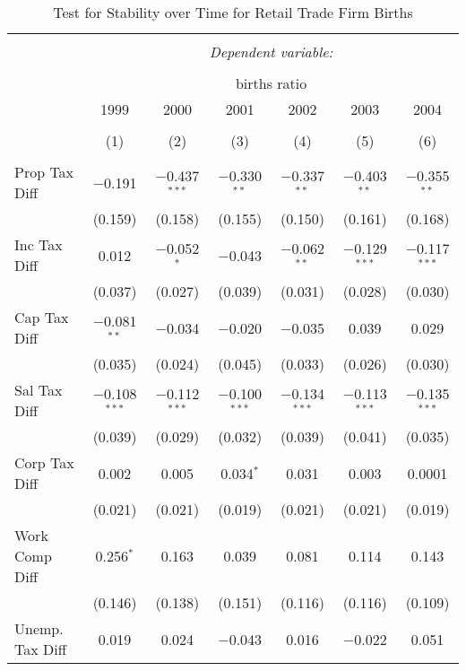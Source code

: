 
\begin{table}[!htbp] \centering 
  \caption{Test for Stability over Time for  Retail Trade Firm Births} 
  \label{44-45year} 
\small 
\begin{tabular}{@{\extracolsep{5pt}}lcccccc} 
\\[-1.8ex]\hline 
\hline \\[-1.8ex] 
 & \multicolumn{6}{c}{\textit{Dependent variable:}} \\ 
\cline{2-7} 
\\[-1.8ex] & \multicolumn{6}{c}{births ratio} \\ 
 & 1999 & 2000 & 2001 & 2002 & 2003 & 2004 \\ 
\\[-1.8ex] & (1) & (2) & (3) & (4) & (5) & (6)\\ 
\hline \\[-1.8ex] 
 Prop Tax Diff & $-$0.191 & $-$0.437$^{***}$ & $-$0.330$^{**}$ & $-$0.337$^{**}$ & $-$0.403$^{**}$ & $-$0.355$^{**}$ \\ 
  & (0.159) & (0.158) & (0.155) & (0.150) & (0.161) & (0.168) \\ 
  Inc Tax Diff & 0.012 & $-$0.052$^{*}$ & $-$0.043 & $-$0.062$^{**}$ & $-$0.129$^{***}$ & $-$0.117$^{***}$ \\ 
  & (0.037) & (0.027) & (0.039) & (0.031) & (0.028) & (0.030) \\ 
  Cap Tax Diff & $-$0.081$^{**}$ & $-$0.034 & $-$0.020 & $-$0.035 & 0.039 & 0.029 \\ 
  & (0.035) & (0.024) & (0.045) & (0.033) & (0.026) & (0.030) \\ 
  Sal Tax Diff & $-$0.108$^{***}$ & $-$0.112$^{***}$ & $-$0.100$^{***}$ & $-$0.134$^{***}$ & $-$0.113$^{***}$ & $-$0.135$^{***}$ \\ 
  & (0.039) & (0.029) & (0.032) & (0.039) & (0.041) & (0.035) \\ 
  Corp Tax Diff & 0.002 & 0.005 & 0.034$^{*}$ & 0.031 & 0.003 & 0.0001 \\ 
  & (0.021) & (0.021) & (0.019) & (0.021) & (0.021) & (0.019) \\ 
  Work Comp Diff & 0.256$^{*}$ & 0.163 & 0.039 & 0.081 & 0.114 & 0.143 \\ 
  & (0.146) & (0.138) & (0.151) & (0.116) & (0.116) & (0.109) \\ 
  Unemp. Tax Diff & 0.019 & 0.024 & $-$0.043 & 0.016 & $-$0.022 & 0.051 \\ 

\end{tabular}
\end{table}
